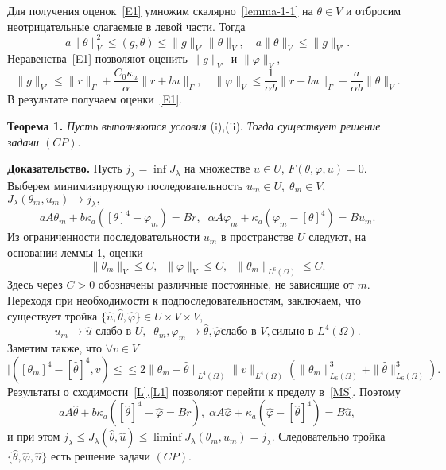 \documentclass[12pt]{article}
\begin{document}
    Для получения оценок~\eqref{E1} умножим скалярно~\eqref{lemma-1-1} на $\theta \in V$ и отбросим неотрицательные
    слагаемые в левой части.
    Тогда
    \[
        a \|\theta\|^2_V \leq (g, \theta) \leq \|g\|_{V'}\|\theta\|_V,
        \quad a\|\theta\|_V \leq \|g\|_{V'}.
    \]
    Неравенства~\eqref{E1} позволяют оценить $\|g\|_{V'}$ и $\|\varphi\|_V $,
    \[
        \|g\|_{V'} \leq \|r\|_\Gamma + \frac{C_0\kappa_a}{\alpha}\|r + bu\|_\Gamma, \quad
        \|\varphi\|_V \leq \frac{1}{\alpha b} \|r + bu\|_\Gamma + \frac{a}{\alpha b} \|\theta\|_V.
    \]
    В результате получаем оценки~\eqref{E1}.

    \textbf{Теорема 1.}
    {\it
        Пусть выполняются условия} (i),(ii).
    {\it Тогда существует решение задачи $(CP).$
    }

    {\bf Доказательство.}
    Пусть $j_\lambda = \inf J_\lambda$ на множестве $u \in U$, $F(\theta, \varphi, u)=0.$
    Выберем минимизирующую последовательность
    $u_m \in U, \; \theta_m \in V$, $J_\lambda(\theta_m, u_m)
    \rightarrow j_\lambda,$
    \begin{equation}
        \label{MS}
        a A \theta_m +b \kappa_a([\theta]^4 - \varphi_m) = Br, \;\;
        \alpha A \varphi_m + \kappa_a (\varphi_m - [\theta]^4) = B u_m.
    \end{equation}
    Из ограниченности последовательности $u_m$ в пространстве $U$ следуют, на основании
    леммы 1, оценки
    \[
        \|\theta_m\|_V \leq C,\;\;
        \|\varphi\|_V \leq C,\;\;\|\theta_m\|_{L^6(\Omega)} \leq C.
    \]
    Здесь через $C>0$ обозначены различные постоянные, не зависящие от $m$.
    Переходя при необходимости к подпоследовательностям, заключаем, что
    существует тройка $\{ \hat{u}, \hat{\theta}, \hat{\varphi} \} \in U \times V \times V,$
    \begin{equation}
        \label{L}
        u_m \rightarrow \hat{u} \text{  слабо в } U, \;\;
        \theta_m, \varphi_m \rightarrow \hat{\theta}, \hat{\varphi} \text{
            слабо в } V, \text{
            сильно в } L^4(\Omega).
    \end{equation}
    Заметим также, что $\forall v \in V$
    \begin{equation}
        \label{L1}
        |( [\theta_m]^4 - [\hat{\theta}]^4, v) \leq
        \leq 2 \| \theta_m - \hat{\theta}\|_{L^4(\Omega)} \|v\|_{L^4(\Omega)}
        \left( \| \theta_m \|^3_{L_6(\Omega)} + \| \hat{\theta} \|^3_{L_6(\Omega)}\right).
    \end{equation}
    Результаты о сходимости~\eqref{L},\eqref{L1} позволяют перейти
    к пределу в~\eqref{MS}.
    Поэтому
    \[
        a A \hat{\theta} + b \kappa_a ([\hat{\theta}]^4 - \hat{\varphi} = Br), \;
        \alpha A \hat{\varphi} + \kappa_a (\hat{\varphi} -[\hat{\theta}]^4) = B \hat{u},
    \]
    и при этом $j_\lambda \leq J_\lambda(\hat{\theta}, \hat{u}) \leq \liminf J_\lambda(\theta_m, u_m) =
    j_\lambda$.
    Следовательно тройка $\{\hat{\theta}, \hat{\varphi}, \hat{u} \}$ есть
    решение задачи $(CP).$
\end{document}
